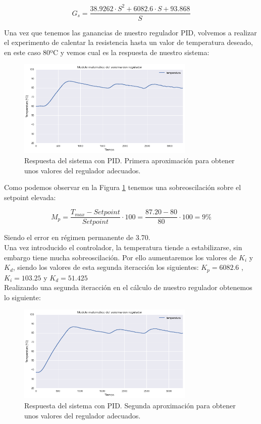 $$G_s = \frac{38.9262 \cdot S^2 + 6082.6 \cdot S + 93.868}{S}$$

Una vez que tenemos las ganancias de nuestro regulador PID, volvemos a realizar el experimento de calentar la resistencia hasta un valor de temperatura deseado, en este caso 80ºC y vemos cual es la respuesta de nuestro sistema:

\begin{figure}[H]
    \centering
    \includegraphics[width=0.75\textwidth]{images/PLC/modelado/modelado_26_1.png}
    \caption[Respuesta del sistema con PID iteracción 1.]{Respuesta del sistema con PID. Primera aproximación para obtener unos valores del regulador adecuados.}
    \label{fig:plc_PID1}
\end{figure}

Como podemos observar en la Figura \ref{fig:plc_PID1} tenemos una sobreoscilación sobre el setpoint elevada:

$$M_{p}=\frac{T_{max}-Setpoint}{Setpoint} \cdot 100 = \frac{87.20-80}{80} \cdot 100 = 9\%$$ 

Siendo el error en régimen  permanente de 3.70.\\

Una vez introducido el controlador, la temperatura tiende a estabilizarse, sin embargo tiene mucha sobreoscilación. Por ello aumentaremos los valores de $K_i$ y $K_d$, siendo los valores de esta segunda iteracción los siguientes:
$K_p = 6082.6$ ,$K_i=103.25$ y $K_d=51.425$\\

Realizando una segunda iteracción en el cálculo de nuestro regulador obtenemos lo siguiente:

\begin{figure}[H]
    \centering
    \includegraphics[width=0.75\textwidth]{images/PLC/modelado/modelado_30_1.png}
    \caption[Respuesta del sistema con PID. Iteracción 2]{Respuesta del sistema con PID. Segunda aproximación para obtener unos valores del regulador adecuados.}
    \label{fig:plc_PID2}
\end{figure}

